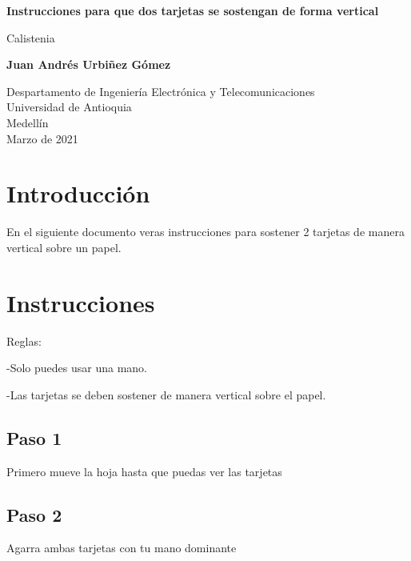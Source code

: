 \documentclass{article}
\begin{document}
\begin{titlepage}
    \begin{center}
        \vspace*{1cm}
            
        \Huge
        \textbf{Instrucciones para que dos tarjetas se sostengan de forma vertical}
            
        \vspace{0.5cm}
        \LARGE
        Calistenia
            
        \vspace{1.5cm}
            
        \textbf{Juan Andrés Urbiñez Gómez}
            
        \vfill
            
        \vspace{0.8cm}
            
        \Large
        Despartamento de Ingeniería Electrónica y Telecomunicaciones\\
        Universidad de Antioquia\\
        Medellín\\
        Marzo de 2021
            
    \end{center}
\end{titlepage}

\tableofcontents
\newpage
\section{Introducción}\label{intro}
En el siguiente documento veras instrucciones para sostener 2 tarjetas de manera vertical sobre un papel.

\section{Instrucciones} \label{contenido}
Reglas:

-Solo puedes usar una mano.

-Las tarjetas se deben sostener de manera vertical sobre el papel.

\subsection{Paso 1}
Primero mueve la hoja hasta que puedas ver las tarjetas

\subsection{Paso 2}
Agarra ambas tarjetas con tu mano dominante
\end{document}
